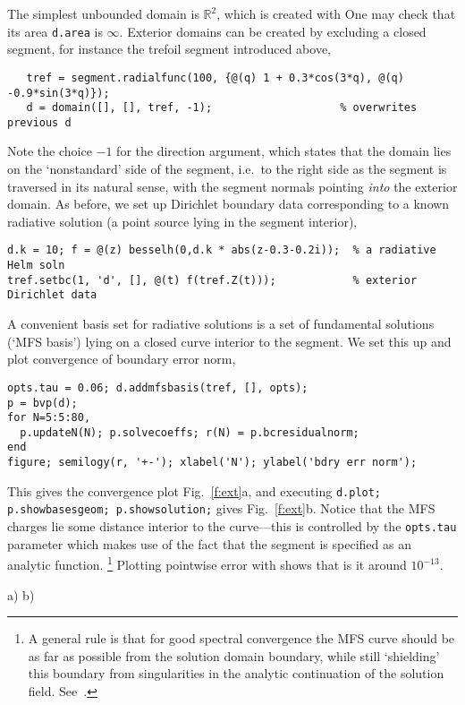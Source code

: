 The simplest unbounded domain is $\mathbb{R}^2$, which is created with
One may check that its area {\tt d.area} is $\infty$.
Exterior domains can be created by excluding a closed segment, for instance
the trefoil segment introduced above,
\begin{verbatim}
   tref = segment.radialfunc(100, {@(q) 1 + 0.3*cos(3*q), @(q) -0.9*sin(3*q)});
   d = domain([], [], tref, -1);                    % overwrites previous d
\end{verbatim}
Note the choice $-1$ for the direction argument, which states that
the domain lies on the `nonstandard' side of the segment, i.e.\
to the right side as the segment is traversed in its natural sense,
with the segment normals pointing {\em into} the exterior domain.
As before, we set up Dirichlet boundary data corresponding to a known
radiative solution (a point source lying in the segment interior),
\begin{verbatim}
d.k = 10; f = @(z) besselh(0,d.k * abs(z-0.3-0.2i));  % a radiative Helm soln
tref.setbc(1, 'd', [], @(t) f(tref.Z(t)));            % exterior Dirichlet data
\end{verbatim}
A convenient basis set for radiative solutions is a set of fundamental
solutions (`MFS basis') lying on a closed curve interior to the segment.
We set this up and plot convergence of boundary error norm,
\begin{verbatim}
opts.tau = 0.06; d.addmfsbasis(tref, [], opts);
p = bvp(d);
for N=5:5:80,
  p.updateN(N); p.solvecoeffs; r(N) = p.bcresidualnorm;
end
figure; semilogy(r, '+-'); xlabel('N'); ylabel('bdry err norm');
\end{verbatim}
This gives the convergence plot Fig.~\ref{f:ext}a, and
executing {\tt d.plot; p.showbasesgeom; p.showsolution;} gives
Fig.~\ref{f:ext}b. Notice that the MFS charges lie some distance interior
to the curve---this is controlled by the {\tt opts.tau} parameter which
makes use of the fact that the segment is specified as an analytic function.%
  \footnote{A general rule is that for good spectral convergence
    the MFS curve should be
    as far as possible from the solution domain boundary, while still
    `shielding' this boundary from singularities in the analytic continuation
    of the solution field. See~\cite{mfs}.}
Plotting pointwise error with
shows that is it around $10^{-13}$.


\bfi %
a)\raisebox{-0.4\textwidth}{\ig{height=0.45\textwidth}{twoholes.eps}}
b)\raisebox{-0.4\textwidth}{\ig{height=0.45\textwidth}{tri.eps}}
\efi

